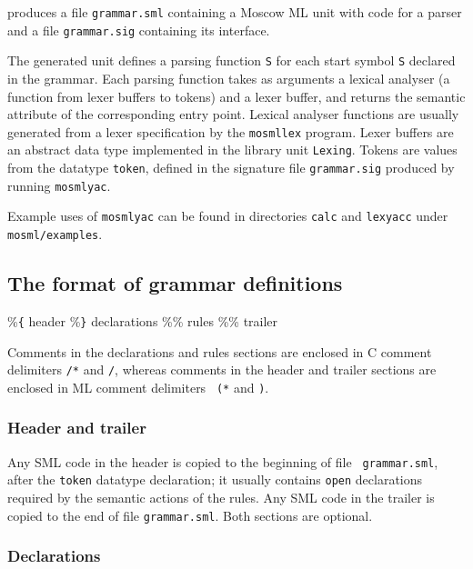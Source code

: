 \documentclass[fleqn]{article}
\begin{document}
\noindent produces a file {\tt grammar.sml} containing a Moscow ML
unit with code for a parser and a file {\tt grammar.sig} containing
its interface.

The generated unit defines a parsing function {\tt S} for each start
symbol {\tt S} declared in the grammar.  Each parsing function takes
as arguments a lexical analyser (a function from lexer buffers to
tokens) and a lexer buffer, and returns the semantic attribute of the
corresponding entry point.  Lexical analyser functions are usually
generated from a lexer specification by the {\tt mosmllex} program.
Lexer buffers are an abstract data type implemented in the library
unit {\tt Lexing}.  Tokens are values from the datatype {\tt token},
defined in the signature file {\tt grammar.sig} produced by running
{\tt mosmlyac}.

Example uses of {\tt mosmlyac} can be found in directories {\tt calc}
and {\tt lexyacc} under {\tt mosml/examples}.


\subsection{The format of grammar definitions}

\begin{program}
\%\verb#{#
  {\rm header}
\%\verb#}#
  {\rm declarations}
\%\%
  {\rm rules}
\%\%
  {\rm trailer}
\end{program}

\noindent Comments in the declarations and rules sections are enclosed
in C comment delimiters {\tt /*} and {\tt */}, whereas comments in the
header and trailer sections are enclosed in ML comment delimiters {\tt
  (*} and {\tt *)}.


\subsubsection{Header and trailer}

Any SML code in the header is copied to the beginning of file {\tt
  grammar.sml}, after the {\tt token} datatype declaration; it usually
contains {\tt open} declarations required by the semantic actions of
the rules.  Any SML code in the trailer is copied to the end of file
{\tt grammar.sml}.  Both sections are optional.


\subsubsection{Declarations}
\end{document}
